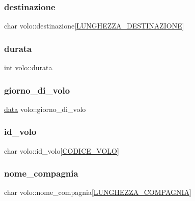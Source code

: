 \subsubsection{\texorpdfstring{destinazione}{destinazione}}
{\footnotesize\ttfamily char volo\+::destinazione\mbox{[}\hyperlink{costanti_8h_ad2da2314fee54750f005c72b82d9310a}{L\+U\+N\+G\+H\+E\+Z\+Z\+A\+\_\+\+D\+E\+S\+T\+I\+N\+A\+Z\+I\+O\+NE}\mbox{]}}

\mbox{\label{structvolo_a0b5ad7cb2a2aee4335c043b085a320c8}} 
\subsubsection{\texorpdfstring{durata}{durata}}
{\footnotesize\ttfamily int volo\+::durata}

\mbox{\label{structvolo_a8017cfc4e25b927088a5ab4c61f2793b}} 
\subsubsection{\texorpdfstring{giorno\+\_\+di\+\_\+volo}{giorno\_di\_volo}}
{\footnotesize\ttfamily \hyperlink{structdata}{data} volo\+::giorno\+\_\+di\+\_\+volo}

\mbox{\label{structvolo_a625724f72992457d9a9f7f284c9f330e}} 
\subsubsection{\texorpdfstring{id\+\_\+volo}{id\_volo}}
{\footnotesize\ttfamily char volo\+::id\+\_\+volo\mbox{[}\hyperlink{costanti_8h_a99ae2e7fbc7078b725a05249bd95f22c}{C\+O\+D\+I\+C\+E\+\_\+\+V\+O\+LO}\mbox{]}}

\mbox{\label{structvolo_a01d7ba0155e69869b1ff2d768a924984}} 
\subsubsection{\texorpdfstring{nome\+\_\+compagnia}{nome\_compagnia}}
{\footnotesize\ttfamily char volo\+::nome\+\_\+compagnia\mbox{[}\hyperlink{costanti_8h_a515b7beeda2306d90ac73a4dfa727097}{L\+U\+N\+G\+H\+E\+Z\+Z\+A\+\_\+\+C\+O\+M\+P\+A\+G\+N\+IA}\mbox{]}}

